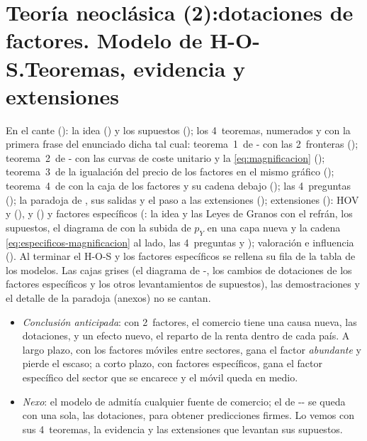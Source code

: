 \documentclass[11pt]{article}
\begin{document}
\section{Teoría neoclásica (2):\newline dotaciones de factores. Modelo de H-O-S.\newline Teoremas, evidencia y extensiones}\label{sec:dotaciones}\label{sec:hos}

\begin{notaopositor}
En el cante (): la idea () y los supuestos (); los 4~teoremas, numerados y con la primera frase del enunciado dicha tal cual: teorema~1~de - con las 2~fronteras (); teorema~2~de - con las curvas de coste unitario y la \eqref{eq:magnificacion} (); teorema~3~de la igualación del precio de los factores en el mismo gráfico (); teorema~4~de  con la caja de los factores y su cadena debajo (); las 4~preguntas (); la paradoja de , sus salidas y el paso a las extensiones (); extensiones (): HOV y  (),  y  () y factores específicos (: la idea y las Leyes de Granos con el refrán, los supuestos, el diagrama de  con la subida de $p_Y$ en una capa nueva y la cadena \eqref{eq:especificos-magnificacion} al lado, las 4~preguntas y ); valoración e influencia (). Al terminar el H-O-S y los factores específicos se rellena su fila de la tabla de los modelos. Las cajas grises (el diagrama de -, los cambios de dotaciones de los factores específicos y los otros levantamientos de supuestos), las demostraciones y el detalle de la paradoja (anexos) no se cantan.
\end{notaopositor}

\begin{itemize}
\item \emph{Conclusión anticipada}: con 2~factores, el comercio tiene una causa nueva, las dotaciones, y un efecto nuevo, el reparto de la renta dentro de cada país. A largo plazo, con los factores móviles entre sectores, gana el factor \emph{abundante} y pierde el escaso; a corto plazo, con factores específicos, gana el factor específico del sector que se encarece y el móvil queda en medio.
\item \emph{Nexo}: el modelo de  admitía cualquier fuente de comercio; el de -- se queda con una sola, las dotaciones, para obtener predicciones firmes. Lo vemos con sus 4~teoremas, la evidencia y las extensiones que levantan sus supuestos.
\end{itemize}
\end{document}
